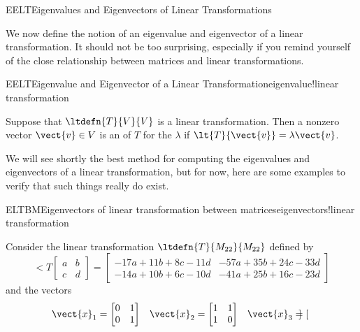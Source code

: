 \begin{subsect}{EELT}{Eigenvalues and Eigenvectors of Linear Transformations}
%
\begin{para}We now define the notion of an eigenvalue and eigenvector of a linear transformation.  It should not be too surprising, especially if you remind yourself of the close relationship between matrices and linear transformations.\end{para}
%
\begin{definition}{EELT}{Eigenvalue and Eigenvector of a Linear Transformation}{eigenvalue!linear transformation}
\begin{para}Suppose that $\ltdefn{T}{V}{V}$ is a linear transformation.  Then a nonzero vector $\vect{v}\in V$ is an  of $T$ for the  $\lambda$ if $\lt{T}{\vect{v}}=\lambda\vect{v}$.\end{para}
\end{definition}
%
\begin{para}We will see shortly the best method for computing the eigenvalues and eigenvectors of a linear transformation, but for now, here are some examples to verify that such things really do exist.\end{para}
%
%
\begin{example}{ELTBM}{Eigenvectors of linear transformation between matrices}{eigenvectors!linear transformation}
\begin{para}Consider the linear transformation $\ltdefn{T}{M_{22}}{M_{22}}$ defined by
%
\begin{equation*}
\lt{T}{\begin{bmatrix}a&b\\c&d\end{bmatrix}}
=
\begin{bmatrix}
-17a+11b+8c-11d
&
-57a+35b+24c-33d
\\
-14a+10b+6c-10d
&
-41a+25b+16c-23d
\end{bmatrix}
\end{equation*}
%
and the vectors
%
\begin{align*}
\vect{x}_1
&=
\begin{bmatrix}
 0 & 1 \\ 0 & 1
\end{bmatrix}
&
\vect{x}_2
&=
\begin{bmatrix}
 1 & 1 \\ 1 & 0
\end{bmatrix}
&
\vect{x}_3
&=
\begin{bmatrix}

\end{bmatrix}
\end{align*}
\end{para}
\end{example}
\end{subsect}

